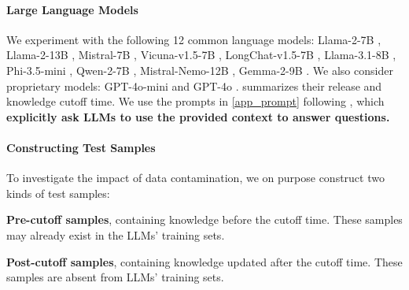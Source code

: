 \documentclass[11pt]{article}
\begin{document}
        \paragraph{Large Language Models}
            We experiment with the following 12 common language models:
            Llama-2-7B \cite{touvron2023llama},
            Llama-2-13B \cite{touvron2023llama},
            Mistral-7B \cite{jiang2023mistral},
            Vicuna-v1.5-7B \cite{vicuna2023},
            LongChat-v1.5-7B \cite{longchat2023},
            Llama-3.1-8B \cite{dubey2024llama},
            Phi-3.5-mini \cite{abdin2024phi},
            Qwen-2-7B \cite{yang2024qwen2},
            Mistral-Nemo-12B \cite{jiang2023mistral},
            Gemma-2-9B \cite{gemma_2024}.
            We also consider proprietary models: GPT-4o-mini and GPT-4o \cite{achiam2023gpt4o}.
             summarizes their release and knowledge cutoff time.
            We use the prompts in \cref{app_prompt} following \citet{bai2024longbench},
            which \textbf{explicitly ask LLMs to use the provided context to answer questions.}



        \paragraph{Constructing Test Samples}
            To investigate the impact of data contamination,
            we on purpose construct two kinds of test samples:
            \begin{inparaenum}
                \item
                    \textbf{Pre-cutoff samples}, containing knowledge before the cutoff time.
                    These samples may already exist in the LLMs' training sets.
                \item
                    \textbf{Post-cutoff samples}, containing knowledge updated after the cutoff time.
                    These samples are absent from LLMs' training sets.
            \end{inparaenum}
\end{document}

